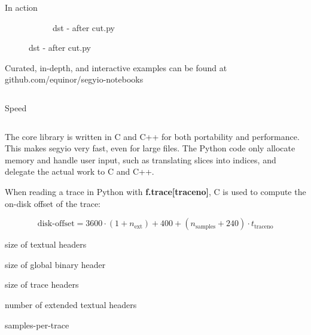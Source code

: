 \documentclass[final]{beamer}
\begin{document}
\begin{frame}{}
\begin{columns}[t]
\begin{column}{\columnmargin}
\begin{block}{\large In action}
\begin{minipage}{0.90\textwidth}
\begin{figure}[c]
\begin{subfigure}{0.40\textwidth}
                \caption{dst - after cut.py}
            \end{subfigure}
        \end{figure}
        \vspace{2ex}
        \end{minipage}

        Curated, in-depth, and interactive examples can be found at
        github.com/equinor/segyio-notebooks
    \end{block}
\end{column}

\end{columns}

\begin{center}
\begin{minipage}{0.9\paperwidth}

\begin{block}{\large Speed}
    \begin{columns}[t]
    \begin{column}{.6\textwidth}
        The core library is written in C and C++ for both portability and
        performance. This makes segyio very fast, even for large files.  The
        Python code only allocate memory and handle user input, such as
        translating slices into indices, and delegate the actual work to C and
        C++.

        When reading a trace in Python with \textbf{f.trace[traceno]}, C is
        used to compute the on-disk offset of the trace:

        \begin{equation*}
            \text{disk-offset}
                = 3600 \cdot (1 + n_\text{ext})
                + 400
                + (n_\text{samples} + 240) \cdot t_\text{traceno}
        \end{equation*}

        \begin{description}[align = right]
            \item [3600] size of textual headers
            \item [400] size of global binary header
            \item [240] size of trace headers
            \item [$n_\text{ext}$] number of extended textual headers
            \item [$n_\text{samples}$] samples-per-trace
        \end{description}


\end{column}
\end{columns}
\end{block}
\end{minipage}
\end{center}
\end{frame}
\end{document}
